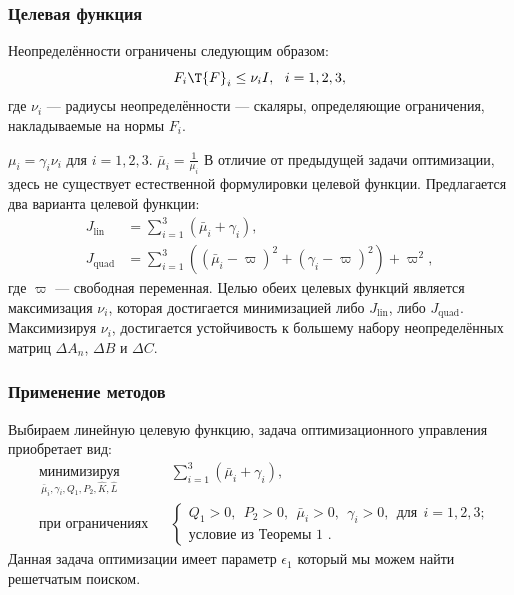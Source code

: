 \begin{frame}
	\frametitle{Целевая функция}
	Неопределённости ограничены следующим образом:
	\begin{equation}
		{F}_i\T{F}_i\leq \nu_i {I}, \ \ i=1,2,3,
	\end{equation}
	где $\nu_i$ --- радиусы неопределённости --- скаляры, определяющие ограничения, накладываемые на нормы ${F}_i$. 
	
	$\mu_i=\gamma_i\nu_i$ для $i=1,2,3$.
	$\bar{\mu}_i=\frac{1}{\mu_i}$
	В отличие от предыдущей задачи оптимизации, здесь не существует естественной формулировки целевой функции. Предлагается два варианта целевой функции:
	\begin{align}
		\label{eq:cost_lin}
		J_\text{lin} &= \sum_{i=1}^{3}\left(\bar{\mu}_i+\gamma_i\right), \\ 
		\label{eq:cost_quad}
		J_\text{quad} & =  \sum_{i=1}^{3}\left((\bar{\mu}_i-\varpi)^2+(\gamma_i-\varpi)^2\right) + \varpi^2,
	\end{align}
	где $\varpi$ --- свободная переменная. Целью обеих целевых функций является максимизация $\nu_i$, которая достигается минимизацией либо $J_\text{lin}$, либо $J_\text{quad}$. Максимизируя $\nu_i$, достигается устойчивость к большему набору неопределённых матриц $\Delta {A}_n$, $\Delta {B}$ и $\Delta {C}$.
\end{frame}

\begin{frame}
	\frametitle{Применение методов}
	Выбираем линейную целевую функцию, задача оптимизационного управления приобретает вид:
	\begin{equation}
		\label{eq:thm4_OCP}
		\begin{aligned}
			& \underset{\bar{\mu}_i,\gamma_i,{Q}_1, {P}_2,\hat{{K}} , \hat{{L}} }{\text{минимизируя}}
			& &  \sum_{i=1}^{3}\left(\bar{\mu}_i+\gamma_i\right), \\
			& \text{при ограничениях}
			& & \begin{cases}
				{Q}_1>0, \ \
				{P}_2>0, \ \
				\bar{\mu}_i>0, \ \
				\gamma_i>0, \ \
				\text{для} \ \ i=1,2,3; \\
				\text{условие из Теоремы 1 }.
			\end{cases}
		\end{aligned}
	\end{equation}
	Данная задача оптимизации имеет параметр $\epsilon_1$ который мы можем найти решетчатым поиском.
\end{frame}

